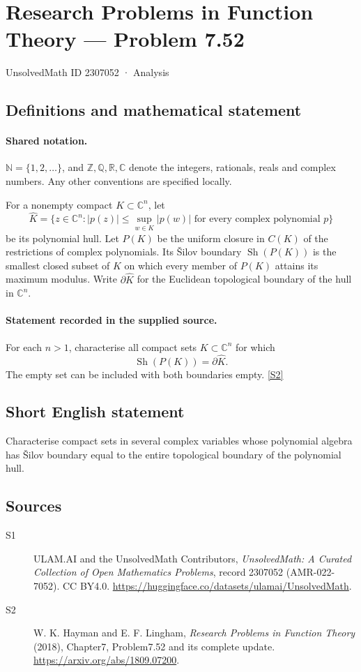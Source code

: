 \documentclass[11pt]{article}
\newcommand{\sref}[2]{\hyperlink{source:#1:#2}{[S#2]}}
\begin{document}
\setcounter{section}{2307051}
\section{Research Problems in Function Theory — Problem 7.52}\label{2307052}
{\small\sffamily UnsolvedMath ID 2307052 · Analysis}
\subsection{Definitions and mathematical statement}

\paragraph{Shared notation.}$\mathbb N=\{1,2,\ldots\}$, and $\mathbb Z,\mathbb Q,\mathbb R,\mathbb C$ denote the integers, rationals, reals and complex numbers. Any other conventions are specified locally.


For a nonempty compact $K\subset\mathbb C^n$, let
\[\widehat K=\{z\in\mathbb C^n:|p(z)|\le\sup_{w\in K}|p(w)|\text{ for every complex polynomial }p\}\]
be its polynomial hull. Let $P(K)$ be the uniform closure in $C(K)$ of the restrictions of complex polynomials. Its Šilov boundary $\operatorname{Sh}(P(K))$ is the smallest closed subset of $K$ on which every member of $P(K)$ attains its maximum modulus. Write $\partial\widehat K$ for the Euclidean topological boundary of the hull in $\mathbb C^n$.

\paragraph{Statement recorded in the supplied source.}
For each $n>1$, characterise all compact sets $K\subset\mathbb C^n$ for which
\[\operatorname{Sh}(P(K))=\partial\widehat K.\]
The empty set can be included with both boundaries empty. \sref{2307052}{2}

\subsection{Short English statement}
Characterise compact sets in several complex variables whose polynomial algebra has Šilov boundary equal to the entire topological boundary of the polynomial hull.
\subsection{Sources}
\begin{description}
\item[\hypertarget{source:2307052:1}{S1}] ULAM.AI and the UnsolvedMath Contributors, \emph{UnsolvedMath: A Curated Collection of Open Mathematics Problems}, record 2307052 (AMR-022-7052). CC BY4.0. \url{https://huggingface.co/datasets/ulamai/UnsolvedMath}.
\item[\hypertarget{source:2307052:2}{S2}] W. K. Hayman and E. F. Lingham, \emph{Research Problems in Function Theory} (2018), Chapter7, Problem7.52 and its complete update. \url{https://arxiv.org/abs/1809.07200}.
\end{description}
\label{end:2307052}
\end{document}
